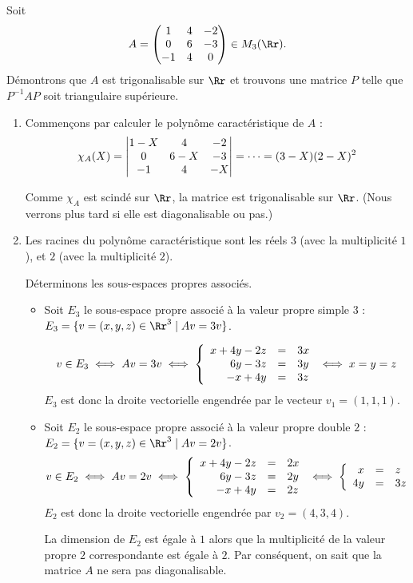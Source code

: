 \documentclass[12pt, class=report,crop=false]{standalone}
\begin{document}
\begin{exemple}
Soit $$A=\begin{pmatrix}1&4&-2\cr0&6&-3\cr-1&4&0\end{pmatrix} \in M_3(\Rr).$$
Démontrons que $A$ est trigonalisable sur $\Rr$ et trouvons une matrice $P$ telle que $P^{-1}AP$ soit triangulaire supérieure.

\begin{enumerate}
  \item  Commençons par calculer le polynôme caractéristique de $A$ :
$$\chi_A(X)=\begin{vmatrix}1-X&4&-2\cr 0&6-X&-3\cr-1&4&-X\end{vmatrix}=\cdots=(3-X)(2-X)^2$$

Comme $\chi_A$ est scindé sur $\Rr$, la matrice est trigonalisable sur $\Rr$. (Nous verrons plus tard si elle est diagonalisable ou pas.)

  \item Les racines du polynôme caractéristique sont les réels $3$ (avec la multiplicité $1$), et $2$ (avec la multiplicité $2$). 

Déterminons les sous-espaces propres associés.
  \begin{itemize}
    \item Soit $E_3$ le sous-espace propre associé à la valeur propre simple $3$ :
$E_3=\{v=(x,y,z)\in\Rr^3 \mid A v = 3v\}$.

$$v\in E_3 
\iff Av = 3v \iff \left\{\begin{array}{rcl}
x+4y-2z&=&3x\cr 
6y-3z&=&3y\cr 
-x+4y&=&3z
\end{array}\right.\iff x=y=z$$
$E_3$ est donc la droite vectorielle engendrée par le vecteur $v_1=(1,1,1)$.

    \item Soit $E_2$ le sous-espace propre associé à la valeur propre double $2$ :
$E_2=\{v=(x,y,z)\in\Rr^3 \mid A v = 2v\}$.
$$v\in E_2\iff Av = 2v \iff  
\left\{\begin{array}{rcl}
x+4y-2z&=&2x\cr
6y-3z&=&2y\cr
-x+4y&=&2z
\end{array}\right.\iff \left\{\begin{array}{rcl}x&=&z\cr 4y&=&3z\end{array}\right.$$
$E_2$ est donc la droite vectorielle engendrée par $v_2=(4,3,4)$.

La dimension de $E_2$ est égale à $1$ alors que la multiplicité de la valeur propre $2$ correspondante est égale à $2$. Par conséquent, on sait que la matrice $A$ ne sera pas diagonalisable.


\end{itemize}
\end{enumerate}
\end{exemple}
\end{document}
